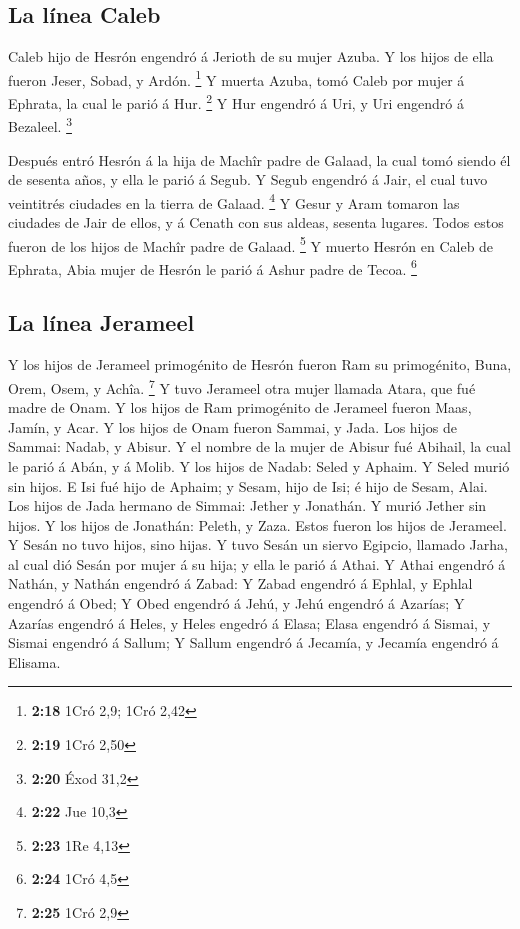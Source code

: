\hypertarget{la-luxednea-caleb}{%
\subsection{La línea Caleb}\label{la-luxednea-caleb}}

 Caleb hijo de Hesrón engendró á Jerioth de su mujer
Azuba. Y los hijos de ella fueron Jeser, Sobad, y Ardón. \footnote{\textbf{2:18}
  1Cró 2,9; 1Cró 2,42}  Y muerta Azuba, tomó Caleb por
mujer á Ephrata, la cual le parió á Hur. \footnote{\textbf{2:19} 1Cró
  2,50}  Y Hur engendró á Uri, y Uri engendró á Bezaleel.
\footnote{\textbf{2:20} Éxod 31,2}

 Después entró Hesrón á la hija de Machîr padre de
Galaad, la cual tomó siendo él de sesenta años, y ella le parió á Segub.
 Y Segub engendró á Jair, el cual tuvo veintitrés
ciudades en la tierra de Galaad. \footnote{\textbf{2:22} Jue 10,3}
 Y Gesur y Aram tomaron las ciudades de Jair de ellos, y
á Cenath con sus aldeas, sesenta lugares. Todos estos fueron de los
hijos de Machîr padre de Galaad. \footnote{\textbf{2:23} 1Re 4,13}
 Y muerto Hesrón en Caleb de Ephrata, Abia mujer de
Hesrón le parió á Ashur padre de Tecoa. \footnote{\textbf{2:24} 1Cró 4,5}

\hypertarget{la-luxednea-jerameel}{%
\subsection{La línea Jerameel}\label{la-luxednea-jerameel}}

 Y los hijos de Jerameel primogénito de Hesrón fueron Ram
su primogénito, Buna, Orem, Osem, y Achîa. \footnote{\textbf{2:25} 1Cró
  2,9}  Y tuvo Jerameel otra mujer llamada Atara, que fué
madre de Onam.  Y los hijos de Ram primogénito de
Jerameel fueron Maas, Jamín, y Acar.  Y los hijos de Onam
fueron Sammai, y Jada. Los hijos de Sammai: Nadab, y Abisur.
 Y el nombre de la mujer de Abisur fué Abihail, la cual
le parió á Abán, y á Molib.  Y los hijos de Nadab: Seled
y Aphaim. Y Seled murió sin hijos.  E Isi fué hijo de
Aphaim; y Sesam, hijo de Isi; é hijo de Sesam, Alai.  Los
hijos de Jada hermano de Simmai: Jether y Jonathán. Y murió Jether sin
hijos.  Y los hijos de Jonathán: Peleth, y Zaza. Estos
fueron los hijos de Jerameel.  Y Sesán no tuvo hijos,
sino hijas.  Y tuvo Sesán un siervo Egipcio, llamado
Jarha, al cual dió Sesán por mujer á su hija; y ella le parió á Athai.
 Y Athai engendró á Nathán, y Nathán engendró á Zabad:
 Y Zabad engendró á Ephlal, y Ephlal engendró á Obed;
 Y Obed engendró á Jehú, y Jehú engendró á Azarías;
 Y Azarías engendró á Heles, y Heles engedró á Elasa;
 Elasa engendró á Sismai, y Sismai engendró á Sallum;
 Y Sallum engendró á Jecamía, y Jecamía engendró á
Elisama.


